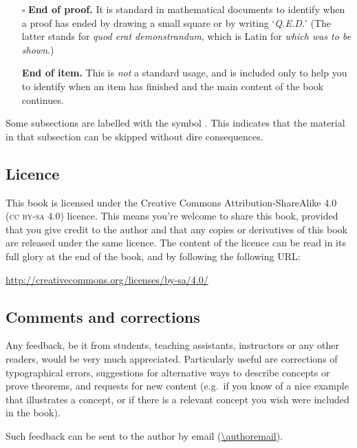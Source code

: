 \begin{itemize}
\item[$\square$] \textbf{End of proof.} It is standard in mathematical documents to identify when a proof has ended by drawing a small square or by writing `\textit{Q.E.D.}' (The latter stands for \textit{quod erat demonstrandum}, which is Latin for \textit{which was to be shown}.)
\item[\nonproofqedsymbol] \textbf{End of item.} This is \textit{not} a standard usage, and is included only to help you to identify when an item has finished and the main content of the book continues.
\end{itemize}

Some subsections are labelled with the symbol \optmarksymbol{}. This indicates that the material in that subsection can be skipped without dire consequences.

\subsection*{Licence}

This book is licensed under the Creative Commons Attribution-ShareAlike 4.0 (\textsc{cc by-sa 4.0}) licence. This means you're welcome to share this book, provided that you give credit to the author and that any copies or derivatives of this book are released under the same licence. The content of the licence can be read in its full glory at the end of the book, and by following the following URL:
\begin{center}
\url{http://creativecommons.org/licenses/by-sa/4.0/}
\end{center}

\subsection*{Comments and corrections}

Any feedback, be it from students, teaching assistants, instructors or any other readers, would be very much appreciated. Particularly useful are corrections of typographical errors, suggestions for alternative ways to describe concepts or prove theorems, and requests for new content (e.g.\ if you know of a nice example that illustrates a concept, or if there is a relevant concept you wish were included in the book).

Such feedback can be sent to the author by email (\url{\authoremail}).